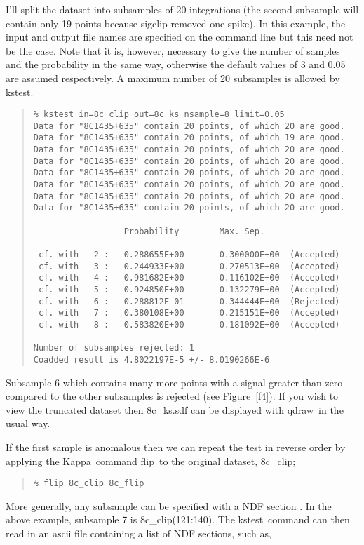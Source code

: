 \documentclass[twoside,11pt,fleqn]{article}
\newenvironment{myquote}{\begin{quote}\begin{small}}{\end{small}\end{quote}}
\newcommand{\Kappa}{\xref{{\sc Kappa}}{sun95}{}}
\newcommand{\task}[1]{{\sf #1}}
\newcommand{\qdraw}{\xref{\task{qdraw}}{sun216}{QDRAW}}
\newcommand{\kstest}{\xref{\task{kstest}}{sun95}{KSTEST}}
\newcommand{\flip}{\xref{\task{flip}}{sun95}{FLIP}}
\newcommand{\xref}[3]{#1}
\begin{document}
I'll split the dataset into subsamples of 20 integrations (the second
subsample will contain only 19 points because sigclip removed one
spike). In this example, the input and output file names are specified
on the command line but this need not be the case.  Note that it is,
however, necessary to give the number of samples and the probability
in the same way, otherwise the default values of 3 and 0.05 are
assumed respectively. A maximum number of 20 subsamples is allowed by
\kstest.

\begin{myquote}
\begin{verbatim}
% kstest in=8c_clip out=8c_ks nsample=8 limit=0.05
Data for "8C1435+635" contain 20 points, of which 20 are good.
Data for "8C1435+635" contain 20 points, of which 19 are good.
Data for "8C1435+635" contain 20 points, of which 20 are good.
Data for "8C1435+635" contain 20 points, of which 20 are good.
Data for "8C1435+635" contain 20 points, of which 20 are good.
Data for "8C1435+635" contain 20 points, of which 20 are good.
Data for "8C1435+635" contain 20 points, of which 20 are good.
Data for "8C1435+635" contain 20 points, of which 20 are good.

                  Probability        Max. Sep.
--------------------------------------------------------------
 cf. with   2 :   0.288655E+00       0.300000E+00  (Accepted)
 cf. with   3 :   0.244933E+00       0.270513E+00  (Accepted)
 cf. with   4 :   0.981682E+00       0.116102E+00  (Accepted)
 cf. with   5 :   0.924850E+00       0.132279E+00  (Accepted)
 cf. with   6 :   0.288812E-01       0.344444E+00  (Rejected)
 cf. with   7 :   0.380108E+00       0.215151E+00  (Accepted)
 cf. with   8 :   0.583820E+00       0.181092E+00  (Accepted)

Number of subsamples rejected: 1
Coadded result is 4.8022197E-5 +/- 8.0190266E-6
\end{verbatim}
\end{myquote}

Subsample 6 which contains many more points with a signal greater than
zero compared to the other subsamples is rejected (see Figure~\ref{f4}).  If
you wish to view the truncated dataset then 8c\_ks.sdf can be
displayed with \qdraw\ in the usual way.

If the first sample is anomalous then we can repeat the test in
reverse order by applying the \Kappa\ command \flip\ to the
original dataset, 8c\_clip;

\begin{myquote}
\begin{verbatim}
% flip 8c_clip 8c_flip
\end{verbatim}
\end{myquote}
More generally, any subsample can be specified with a
\xref{NDF section}{sun33}{ndf_sections} \cite{ndf}. In the above
example, subsample 7 is 8c\_clip(121:140). The \kstest\ command can then
read in an ascii file containing a list of NDF sections, such as,
\end{document}
